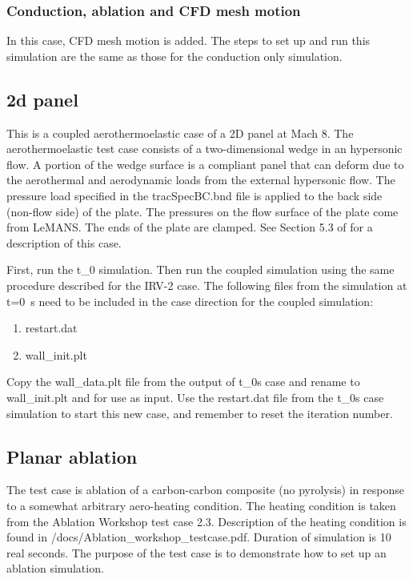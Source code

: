 \documentclass[]{article}
\begin{document}
\subsubsection{Conduction, ablation and CFD mesh motion}

In this case, CFD mesh motion is added.  The steps to set up and run this simulation are the same as those for the conduction only simulation.

\subsection{2d panel}
This is a coupled aerothermoelastic case of a 2D panel at Mach 8. The aerothermoelastic test case consists of a two-dimensional wedge in an hypersonic flow. A portion of the wedge surface is a compliant panel that can deform due to the aerothermal and aerodynamic loads from the external hypersonic flow.  The pressure load specified in the tracSpecBC.bnd file is applied to the back side (non-flow side) of the plate. The pressures on the flow surface of the plate come from LeMANS.  The ends of the plate are clamped.  See Section 5.3 of \cite{wiebenga_thesis} for a description of this case.  

First, run the t\_0 simulation.  Then run the coupled simulation using the same procedure described for the IRV-2 case.  The following files from the simulation at t=0~s need to be included in the case direction for the coupled simulation:

\begin{enumerate}
\item restart.dat\\
\item wall\_init.plt\\
\end{enumerate}

\noindent Copy the {\selectfont wall\_data.plt} file from the output of {\selectfont t\_0s} case and rename to {\selectfont wall\_init.plt} and for use as input. Use the {\selectfont restart.dat} file from the {\selectfont t\_0s} case simulation to start this new case, and remember to reset the iteration number.

\subsection{Planar ablation}

The test case is ablation of a carbon-carbon composite (no pyrolysis) in response to a somewhat arbitrary aero-heating condition.  The heating condition is taken from the Ablation Workshop test case 2.3.  Description of the heating condition is found in /docs/Ablation\_workshop\_testcase.pdf.  Duration of simulation is 10 real seconds. The purpose of the test case is to demonstrate how to set up an ablation simulation.  
\end{document}
